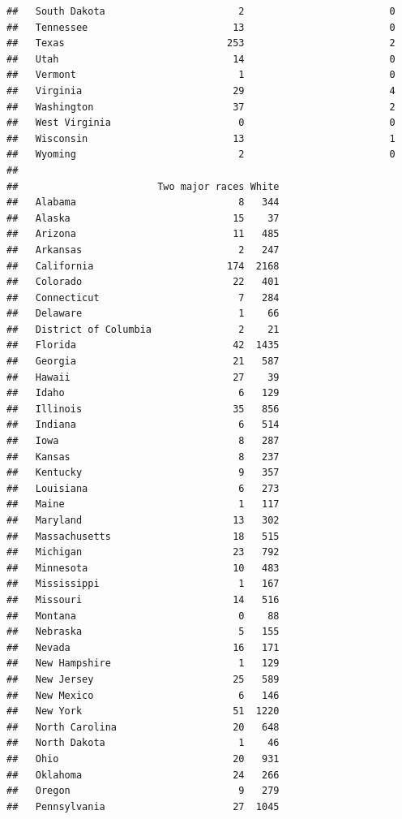 \documentclass[]{book}
\newenvironment{Shaded}{\begin{snugshade}}{\end{snugshade}}
\theoremstyle{definition}
\theoremstyle{definition}
\theoremstyle{definition}
\theoremstyle{remark}
\begin{document}
\begin{Shaded}
\begin{Highlighting}[]
\begin{Shaded}
\begin{Highlighting}[]
\begin{verbatim}
##   South Dakota                       2                         0
##   Tennessee                         13                         0
##   Texas                            253                         2
##   Utah                              14                         0
##   Vermont                            1                         0
##   Virginia                          29                         4
##   Washington                        37                         2
##   West Virginia                      0                         0
##   Wisconsin                         13                         1
##   Wyoming                            2                         0
##                       
##                        Two major races White
##   Alabama                            8   344
##   Alaska                            15    37
##   Arizona                           11   485
##   Arkansas                           2   247
##   California                       174  2168
##   Colorado                          22   401
##   Connecticut                        7   284
##   Delaware                           1    66
##   District of Columbia               2    21
##   Florida                           42  1435
##   Georgia                           21   587
##   Hawaii                            27    39
##   Idaho                              6   129
##   Illinois                          35   856
##   Indiana                            6   514
##   Iowa                               8   287
##   Kansas                             8   237
##   Kentucky                           9   357
##   Louisiana                          6   273
##   Maine                              1   117
##   Maryland                          13   302
##   Massachusetts                     18   515
##   Michigan                          23   792
##   Minnesota                         10   483
##   Mississippi                        1   167
##   Missouri                          14   516
##   Montana                            0    88
##   Nebraska                           5   155
##   Nevada                            16   171
##   New Hampshire                      1   129
##   New Jersey                        25   589
##   New Mexico                         6   146
##   New York                          51  1220
##   North Carolina                    20   648
##   North Dakota                       1    46
##   Ohio                              20   931
##   Oklahoma                          24   266
##   Oregon                             9   279
##   Pennsylvania                      27  1045

\end{verbatim}
\end{Highlighting}
\end{Shaded}
\end{Highlighting}
\end{Shaded}
\end{document}
